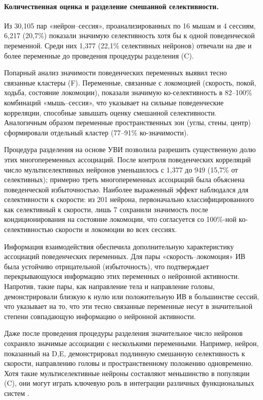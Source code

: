 \paragraph{Количественная оценка и разделение смешанной селективности.}
Из 30{,}105 пар «нейрон--сессия», проанализированных по 16 мышам и 4 сессиям, 6{,}217
(20,7\%) показали значимую селективность хотя бы к одной поведенческой переменной.
Среди них 1{,}377 (22,1\% селективных нейронов) отвечали на две и более
переменные до проведения процедуры разделения (C).

Попарный анализ значимости поведенческих переменных выявил тесно связанные
кластеры (F). Переменные, связанные с локомоцией (скорость, покой,
ходьба, состояние локомоции), показали значимую ко-селективность в 82--100\%
комбинаций «мышь--сессия», что указывает на сильные поведенческие корреляции, способные
завышать оценку смешанной селективности. Аналогичным образом переменные пространственных зон (углы,
стены, центр) сформировали отдельный кластер (77--91\% ко-значимости).

Процедура разделения на основе УВИ позволила разрешить существенную долю этих
многопеременных ассоциаций. После контроля поведенческих корреляций
число мультиселективных нейронов уменьшилось с 1{,}377 до 949 (15,7\% от
селективных); примерно треть многопеременных ассоциаций была объяснена
поведенческой избыточностью. Наиболее выраженный эффект наблюдался для селективности к скорости: из 201
нейрона, первоначально классифицированного как селективный к скорости, лишь 7 сохранили значимость после
кондиционирования на состояние локомоции, что согласуется со 100\%-ной ко-селективностью скорости и локомоции во всех сессиях.

Информация взаимодействия обеспечила дополнительную характеристику ассоциаций поведенческих переменных.
Для пары «скорость--локомоция» ИВ была устойчиво отрицательной (избыточность), что подтверждает
перекрывающуюся информацию этих переменных о нейронной активности.
Напротив, такие пары, как направление тела и направление головы, демонстрировали близкую к нулю или
положительную ИВ в большинстве сессий, что указывает на то, что эти тесно связанные переменные
несут в значительной степени совпадающую информацию о нейронной активности.

Даже после проведения процедуры разделения значительное число нейронов сохраняло значимые
ассоциации с несколькими переменными. Например, нейрон, показанный на
D,E, демонстрировал подлинную смешанную селективность к скорости, направлению головы и
пространственному положению одновременно. Хотя такие мультиселективные нейроны составляют меньшинство
в популяции (C), они могут играть ключевую роль в интеграции
различных функциональных систем \cite{mix3}.

